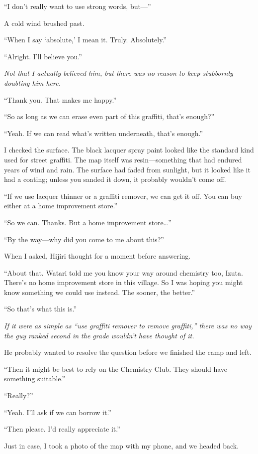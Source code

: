 \documentclass[
    a4paper,
    12pt,
    twoside,
    openany,
    UTF8,
    fontset=windows
]{ctexbook}
\begin{document}
``I don't really want to use strong words, but---''

A cold wind brushed past.

``When I say `absolute,' I mean it. Truly. Absolutely.''

``Alright. I'll believe you.''

\textit{Not that I actually believed him, but there was no reason to keep stubbornly doubting him here.}

``Thank you. That makes me happy.''

``So as long as we can erase even part of this graffiti, that's enough?''

``Yeah. If we can read what's written underneath, that's enough.''

I checked the surface. The black lacquer spray paint looked like the standard kind used for street graffiti. The map itself was resin---something that had endured years of wind and rain. The surface had faded from sunlight, but it looked like it had a coating; unless you sanded it down, it probably wouldn't come off.

``If we use lacquer thinner or a graffiti remover, we can get it off. You can buy either at a home improvement store.''

``So we can. Thanks. But a home improvement store\dots''

``By the way---why did you come to me about this?''

When I asked, Hijiri thought for a moment before answering.

``About that. Watari told me you know your way around chemistry too, Izuta. There's no home improvement store in this village. So I was hoping you might know something we could use instead. The sooner, the better.''

``So that's what this is.''

\textit{If it were as simple as ``use graffiti remover to remove graffiti,'' there was no way the guy ranked second in the grade wouldn't have thought of it.}

He probably wanted to resolve the question before we finished the camp and left.

``Then it might be best to rely on the Chemistry Club. They should have something suitable.''

``Really?''

``Yeah. I'll ask if we can borrow it.''

``Then please. I'd really appreciate it.''

Just in case, I took a photo of the map with my phone, and we headed back.
\end{document}
